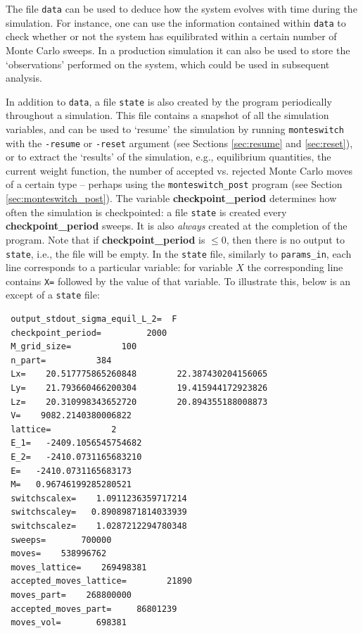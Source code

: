\documentclass{report}
\begin{document}
The file \texttt{data} can be used to deduce how the system evolves with time during the simulation. For instance, one can use the information contained 
within \texttt{data} to check whether or not the system has equilibrated within a certain number of Monte Carlo sweeps. In a production simulation it
can also be used to store the `observations' performed on the system, which could be used in subsequent analysis.

In addition to \texttt{data}, a file \texttt{state} is also created by the program periodically throughout a simulation. This file contains a
snapshot of all the 
simulation variables, and can be used to `resume' the simulation by running \texttt{monteswitch} with the \texttt{-resume} or \texttt{-reset} argument
(see Sections \ref{sec:resume} and \ref{sec:reset}), or to extract the `results' of the simulation, e.g., equilibrium quantities, the current weight 
function, the number of accepted vs. rejected Monte Carlo moves of a certain type -- perhaps using the \texttt{monteswitch\_post} program 
(see Section \ref{sec:monteswitch_post}).
The variable \textbf{checkpoint\_period} determines how often the simulation is checkpointed: a file \texttt{state} is created every 
\textbf{checkpoint\_period} sweeps. It is also \emph{always} created at the completion of the program. Note that if \textbf{checkpoint\_period} is $\leq 0$, 
then there is no output to \texttt{state}, i.e., the file will be empty.
In the \texttt{state} file, similarly to \texttt{params\_in}, each line corresponds to a particular variable: for variable $X$ the corresponding line contains
\texttt{X=} followed by the value of that variable. To illustrate this, below is an except of a \texttt{state} file:
\begin{verbatim}
 output_stdout_sigma_equil_L_2=  F
 checkpoint_period=         2000
 M_grid_size=          100
 n_part=          384
 Lx=    20.517775865260848        22.387430204156065     
 Ly=    21.793660466200304        19.415944172923826     
 Lz=    20.310998343652720        20.894355188008873     
 V=    9082.2140380006822     
 lattice=            2
 E_1=   -2409.1056545754682     
 E_2=   -2410.0731165683210     
 E=   -2410.0731165683173     
 M=   0.96746199285280521     
 switchscalex=    1.0911236359717214     
 switchscaley=   0.89089871814033939     
 switchscalez=    1.0287212294780348     
 sweeps=       700000
 moves=    538996762
 moves_lattice=    269498381
 accepted_moves_lattice=        21890
 moves_part=    268800000
 accepted_moves_part=     86801239
 moves_vol=       698381
\end{verbatim}
\end{document}
